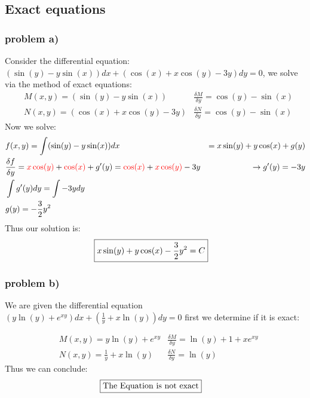 \documentclass{article}
\begin{document}
\pagestyle{fancy}

\setcounter{section}{2}
\setcounter{subsection}{3}
\setcounter{subsubsection}{0}

\subsection{Exact equations}
\subsubsection{problem a)}
Consider the differential equation: $(\sin(y) - y\sin(x))dx + (\cos(x) + x\cos(y) - 3y)dy = 0$, we solve via the method of exact equations:
\begin{align*}
    & M(x,y) = (\sin(y) - y\sin(x)) & \frac{\delta M}{\delta y} = \cos(y) - \sin(x)\\
    & N(x,y) = (\cos(x) + x\cos(y) - 3y) & \frac{\delta N}{\delta y} = \cos(y) - \sin(x)
\end{align*}
Now we solve:
\begin{align}
    & f(x,y) = \int(\sin(y) - y\sin(x))dx & = x\sin(y) + y\cos(x) + g(y)\\
     &\frac{\delta f}{\delta y} = \textcolor{red}{x\cos(y)} + \textcolor{red}{\cos(x)} + g'(y) =
     \textcolor{red}{\cos(x)} + \textcolor{red}{x\cos(y)} - 3y & \rightarrow  g'(y) = -3y\\
     & \int g'(y)dy = \int -3ydy\\
     & g(y) = -\frac{3}{2}y^2
\end{align}
Thus our solution is:
\begin{align}
     \Aboxed{x\sin(y) + y\cos(x) - \frac{3}{2}y^2 = C}
\end{align}
\setcounter{subsubsection}{0}\subsubsection{problem b)}
We are given the differential equation $ (y\ln(y) + e^{xy})dx + (\frac{1}{y} + x\ln(y))dy = 0 $ first we determine if it is exact: 

\setcounter{equation}{0}
\begin{align*}
    &M(x,y) = y\ln(y) + e^{xy} & \frac{\delta M}{\delta y} = \ln(y) + 1 + xe^{xy}\\
    &N(x,y) = \frac{1}{y} + x\ln(y) & \frac{\delta N}{\delta y} = \ln(y)
\end{align*}
Thus we can conclude:
\begin{align*}
    \Aboxed{\text{The Equation is not exact}}
\end{align*}
\end{document}

